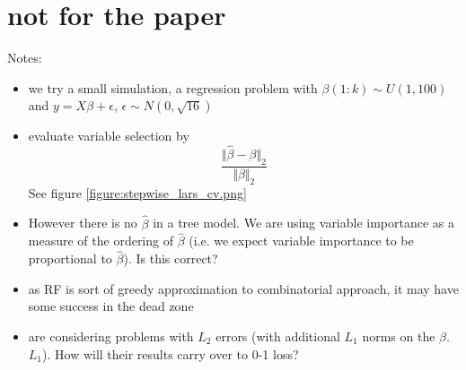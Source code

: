 \documentclass[10pt,letterpaper]{article}
\begin{document}
\section{not for the paper}
Notes:
\begin{itemize}
\item we try a small simulation, a regression problem with $\beta(1:k) \sim U(1,100)$ and $y= X\beta + \epsilon$, $\epsilon \sim  N(0,\sqrt{16})$
\item \cite{Donoho.and.Stodden.2006} evaluate variable selection by 
$$\frac{\Vert\hat{\beta}-\beta\Vert_2}{\Vert\beta\Vert_2}$$
See figure \ref{figure:stepwise_lars_cv.png} 
\item 
However there is no $\hat{\beta}$ in a tree model. We are using variable importance as
a measure of the ordering of $\hat{\beta}$ (i.e. we expect variable importance to be proportional to $\hat{\beta}$). Is this correct?
\item as RF is sort of greedy approximation to combinatorial approach, it may have some success in the dead zone
\item  \cite{Donoho.and.Stodden.2006} are considering problems with $L_2$ errors (with additional  $L_1$ norms on the
  $\beta$. $L_1$).
How will their results carry over to 0-1 loss?
\end{itemize}
\end{document}
